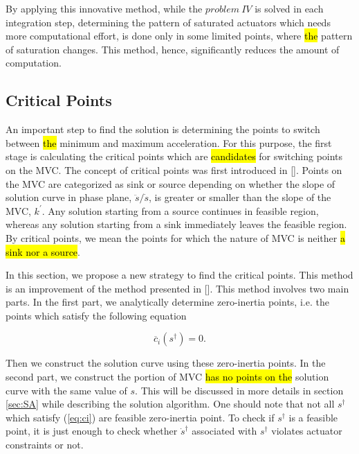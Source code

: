 \documentclass{rob}%
\begin{document}
By applying  this innovative method, while the $ problem \ IV $ is solved in each integration step, determining the pattern of saturated actuators which needs more computational effort, is done only in some limited points, where \hl{the} pattern of saturation changes.
This method, hence, significantly reduces the amount of computation.


\subsection{Critical Points}
\label{subsec:CP}
An important step to find the solution is determining the points to switch between \hl{the} minimum and maximum acceleration. For this purpose, the first stage is calculating the critical points which are \hl{candidates} for switching points on the MVC. 
The concept of critical points was first introduced in [].
Points on the MVC are categorized as sink or source depending on whether the slope of solution curve in phase plane, $ \ddot s/\dot s $, is greater or smaller than the slope of the MVC, $ k^\prime $.
Any solution starting from a source continues in feasible region, whereas any solution starting from a sink immediately leaves the feasible region. By critical points, we mean the points for which the nature of MVC is neither \hl{a sink  nor a source}.

In this section, we propose a new strategy to find the critical points. This method is an improvement of the method presented in []. 
This method involves two main parts. In the first part, we analytically determine zero-inertia points, i.e. the points which satisfy the following equation \cite{Ghasemi2008}

\begin{equation}
{{\overline c}}_i(s^\dagger)=0.
\label{eq:ci}
\end{equation}

\noindent
Then we construct the solution curve using these zero-inertia points. In the second part, we construct the portion of MVC \hl{has no points on the} solution curve with the same value of $ s $. This will be discussed in more details in section \ref{sec:SA} while describing the solution algorithm. One should note that 
not all $ s^\dagger $ which satisfy (\ref{eq:ci}) are feasible zero-inertia point. To check if $ s^\dagger $ is a feasible point, it is just enough to check whether $ \dot{s}^\dagger $ associated with $ s^\dagger $ violates actuator constraints or not.
\end{document}
